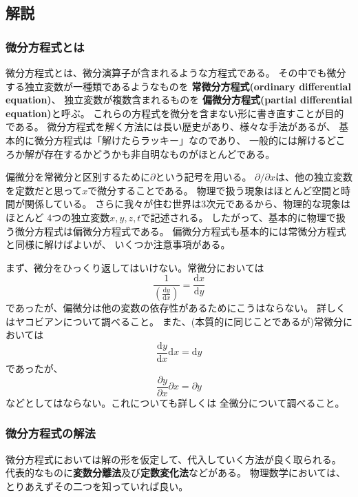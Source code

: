 \documentclass{jarticle}
\newcommand{\diff}{\mathrm d}
\begin{document}
\subsection{解説}

\subsubsection{微分方程式とは}

微分方程式とは、微分演算子が含まれるような方程式である。
その中でも微分する独立変数が一種類であるようなものを
{\bf 常微分方程式(ordinary differential equation)}、
独立変数が複数含まれるものを
{\bf 偏微分方程式(partial differential equation)}と呼ぶ。
これらの方程式を微分を含まない形に書き直すことが目的である。
微分方程式を解く方法には長い歴史があり、様々な手法があるが、
基本的に微分方程式は「解けたらラッキー」なのであり、
一般的には解けるどころか解が存在するかどうかも非自明なものがほとんどである。

偏微分を常微分と区別するために$\partial$という記号を用いる。
$\partial/\partial x$は、他の独立変数を定数だと思って$x$で微分することである。
物理で扱う現象はほとんど空間と時間が関係している。
さらに我々が住む世界は3次元であるから、物理的な現象はほとんど
4つの独立変数$x,y,z,t$で記述される。
したがって、基本的に物理で扱う微分方程式は偏微分方程式である。
偏微分方程式も基本的には常微分方程式と同様に解けばよいが、
いくつか注意事項がある。

まず、微分をひっくり返してはいけない。常微分においては
\begin{equation}
  \frac{1}{\displaystyle \left( \frac{\diff y}{\diff x} \right)} = \frac{\diff x}{\diff y}
\end{equation}
であったが、偏微分は他の変数の依存性があるためにこうはならない。
詳しくはヤコビアンについて調べること。
また、(本質的に同じことであるが)常微分においては
\begin{equation}
  \frac{\diff y}{\diff x} \diff x = \diff y
\end{equation}
であったが、
\begin{equation}
  \frac{\partial y}{\partial x} \partial x = \partial y
\end{equation}
などとしてはならない。これについても詳しくは
全微分について調べること。

\subsubsection{微分方程式の解法}

微分方程式においては解の形を仮定して、代入していく方法が良く取られる。
代表的なものに{\bf 変数分離法}及び{\bf 定数変化法}などがある。
物理数学においては、とりあえずその二つを知っていれば良い。
\end{document}

